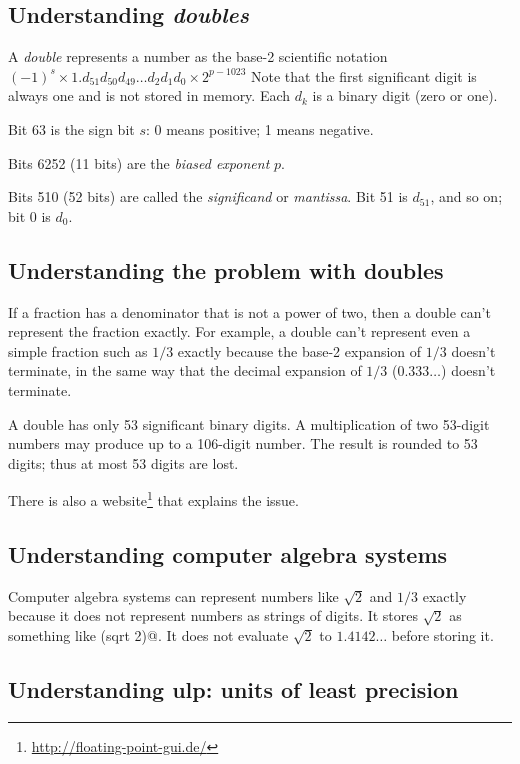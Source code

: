 \subsection{Understanding \emph{doubles}}

A \emph{double} represents a number as the base-2 scientific notation
\(
(-1)^s \times 1 . d_{51} d_{50} d_{49} \ldots d_2 d_1 d_0 \times 2^{p - 1023}
\)
Note that the first significant digit is always one and is not stored in memory.
Each \(d_k\) is a binary digit (zero or one).

Bit 63 is the sign bit \(s\):
0 means positive;
1 means negative.

Bits 62\textendash{}52 (11 bits) are the \emph{biased exponent} \(p\).

Bits 51\textendash{}0 (52 bits) are called the \emph{significand} or \emph{mantissa}.
Bit 51 is \(d_{51}\), and so on; bit 0 is \(d_0\).

\subsection{Understanding the problem with doubles}

If a fraction has a denominator that is not a power of two,
then a double can't represent the fraction exactly.
For example, a double can't represent even a simple fraction such as \(1/3\) exactly
because the base-2 expansion of \(1/3\) doesn't terminate,
in the same way that the decimal expansion of \(1/3\) (\(0.333\ldots\)) doesn't terminate.

A double has only 53 significant binary digits.
A multiplication of two 53-digit numbers may produce up to a 106-digit number.
The result is rounded to 53 digits; thus at most 53 digits are lost.

There is also a website\footnote{\url{http://floating-point-gui.de/}} that explains the issue.

\subsection{Understanding computer algebra systems}

Computer algebra systems can represent numbers like \(\sqrt{2}\) and \(1/3\) exactly because
it does not represent numbers as strings of digits.
It stores \(\sqrt{2}\) as something like \verb@(sqrt 2)@.
It does not evaluate \(\sqrt{2}\) to \(1.4142\ldots\) before storing it.

\subsection{Understanding ulp: units of least precision}

